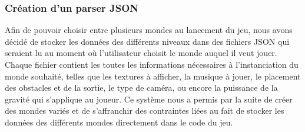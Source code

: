\subsubsection{Création d'un parser JSON}
Afin de pouvoir choisir entre plusieurs mondes au lancement du jeu, nous avons décidé de stocker les données des différents niveaux dans des fichiers JSON qui seraient lu au moment où l'utilisateur choisit le monde auquel il veut jouer.
\ml
Chaque fichier contient les toutes les informations nécessaires à l'instanciation du monde souhaité, telles que les textures à afficher, la musique à jouer, le placement des obstacles et de la sortie, le type de caméra, ou encore la puissance de la gravité qui s'applique au joueur.
\ml
Ce système nous a permis par la suite de créer des mondes variés et de s'affranchir des contraintes liées au fait de stocker les données des différents mondes directement dans le code du jeu.

